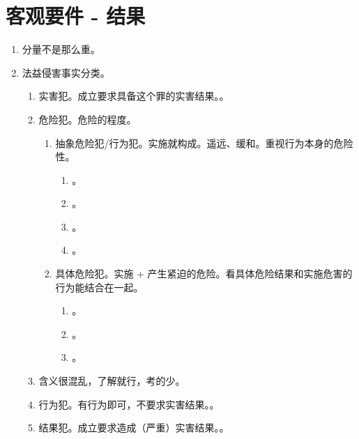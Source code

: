 \section{客观要件 - 结果}
\begin{enumerate}
  \item 分量不是那么重。
  \item 法益侵害事实分类。
        \begin{enumerate}
          \item 实害犯。成立要求具备这个罪的实害结果。。
          \item 危险犯。危险的程度。
                \begin{enumerate}
                  \item 抽象危险犯/行为犯。实施就构成。遥远、缓和。重视行为本身的危险性。
                        \begin{enumerate}
                          \item {}。
                          \item {}。
                          \item {}。
                          \item {}。
                        \end{enumerate}
                  \item 具体危险犯。实施 + 产生紧迫的危险。看具体危险结果和实施危害的行为能结合在一起。
                        \begin{enumerate}
                          \item {}。
                          \item {}。
                          \item {}。
                        \end{enumerate}
                \end{enumerate}
          \item \xjt 含义很混乱，了解就行，考的少。
          \item 行为犯。有行为即可，不要求实害结果。。
          \item 结果犯。成立要求造成（严重）实害结果。。
        \end{enumerate}

\end{enumerate}
